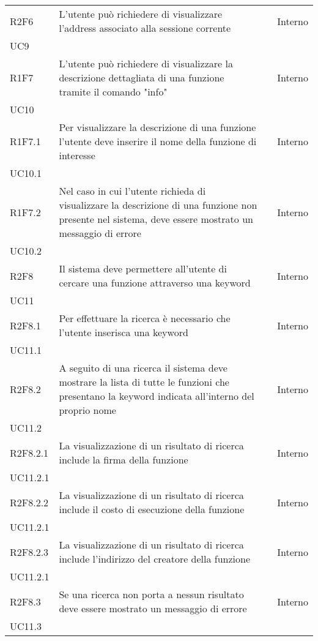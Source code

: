 \begin{longtable}{ 
		>{\centering}p{} 
		>{}p{} 
		>{\centering}p{}
		>{\centering}p{} }
	R2F6 & L'utente può richiedere di visualizzare l'address 
			associato alla sessione corrente 										& \de & Interno \\ UC9 \tabularnewline
	
	R1F7 & L'utente può richiedere di visualizzare la descrizione dettagliata di una funzione
		tramite il comando "info"													& \ob & Interno \\ UC10 \tabularnewline
	R1F7.1 & Per visualizzare la descrizione di una funzione l'utente deve inserire 
		il nome della funzione di interesse											& \ob & Interno \\ UC10.1 \tabularnewline
	R1F7.2 & Nel caso in cui l'utente richieda di visualizzare la descrizione di una 
		funzione non presente nel sistema, deve essere mostrato un messaggio di
		errore															 			& \ob & Interno \\ UC10.2 \tabularnewline
	
	R2F8 & Il sistema deve permettere all'utente di cercare una funzione 
		attraverso una keyword 														& \de & Interno \\ UC11 \tabularnewline
	R2F8.1 & Per effettuare la ricerca è necessario che l'utente inserisca 
		una keyword 																& \de & Interno \\ UC11.1 \tabularnewline
	R2F8.2 & A seguito di una ricerca il sistema deve mostrare la lista di
	 tutte le funzioni che presentano la keyword indicata 
	 all'interno del proprio nome													& \de & Interno \\ UC11.2 \tabularnewline
	R2F8.2.1 & La visualizzazione di un risultato di ricerca include
		 la firma della funzione													& \de & Interno \\ UC11.2.1 \tabularnewline
  	R2F8.2.2 & La visualizzazione di un risultato di ricerca include
		  il costo di esecuzione della funzione										& \de & Interno \\ UC11.2.1 \tabularnewline
  	R2F8.2.3 & La visualizzazione di un risultato di ricerca include
		  l'indirizzo del creatore della funzione									& \de & Interno \\ UC11.2.1 \tabularnewline
	R2F8.3 & Se una ricerca non porta a nessun risultato deve essere mostrato un 
		messaggio di errore 														& \de & Interno \\ UC11.3 	\tabularnewline	
	

\end{longtable}
